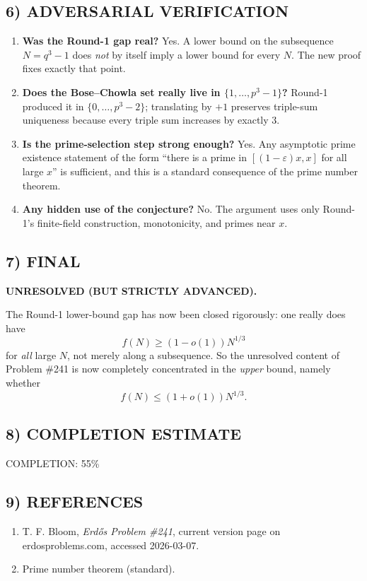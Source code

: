\subsection*{6) ADVERSARIAL VERIFICATION}
\begin{enumerate}
\item \textbf{Was the Round-1 gap real?} Yes. A lower bound on the subsequence $N=q^3-1$ does \emph{not} by itself imply a lower bound for every $N$. The new proof fixes exactly that point.
\item \textbf{Does the Bose--Chowla set really live in $\{1,\dots,p^3-1\}$?} Round-1 produced it in $\{0,\dots,p^3-2\}$; translating by $+1$ preserves triple-sum uniqueness because every triple sum increases by exactly $3$.
\item \textbf{Is the prime-selection step strong enough?} Yes. Any asymptotic prime existence statement of the form ``there is a prime in $[(1-\varepsilon)x,x]$ for all large $x$'' is sufficient, and this is a standard consequence of the prime number theorem.
\item \textbf{Any hidden use of the conjecture?} No. The argument uses only Round-1's finite-field construction, monotonicity, and primes near $x$.
\end{enumerate}

\subsection*{7) FINAL}
\textbf{UNRESOLVED (BUT STRICTLY ADVANCED).}

The Round-1 lower-bound gap has now been closed rigorously: one really does have
\[
 f(N)\ge (1-o(1))N^{1/3}
\]
for \emph{all} large $N$, not merely along a subsequence. So the unresolved content of Problem \#241 is now completely concentrated in the \emph{upper} bound, namely whether
\[
 f(N)\le (1+o(1))N^{1/3}.
\]

\subsection*{8) COMPLETION ESTIMATE}
COMPLETION: 55\%

\subsection*{9) REFERENCES}
\begin{enumerate}
\item T. F. Bloom, \emph{Erd\H{o}s Problem \#241}, current version page on erdosproblems.com, accessed 2026-03-07.
\item Prime number theorem (standard).
\end{enumerate}

\newpage
